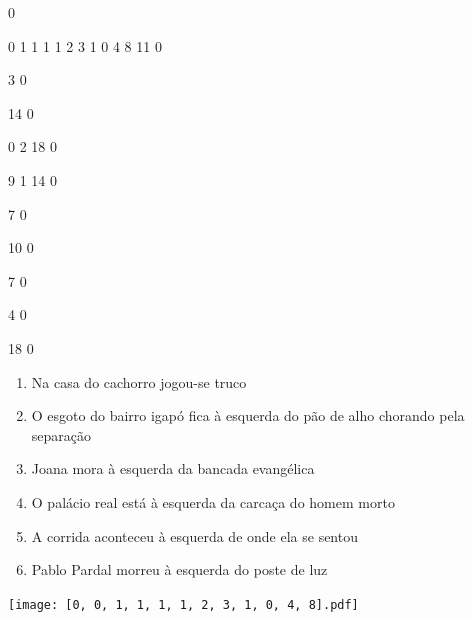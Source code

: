 \documentclass[12pt]{article}
\begin{document}
		\vfill  
		  
{
	0	%

	0	%
	1	%
	1	%
	1	%
	1	%
	2	%
	3	%
	1	%
	0	%
	4	%
	8	%
	11	%
	0	%

	3	%
	0	%

	14	%
	0	%

	0	%
	2	%
	18	%
	0	%

	9	%
	1	%
	14	%
	0	%

	7	%
	0	%

	10	%
	0	%

	7	%
	0	%

	4	%
	0	%

	18	%
	0	%

}	  
		    	

		 

\pagebreak


	\begin{enumerate}
		  \sffamily %
		  \large %


\vfill \item
Na casa do cachorro	%
jogou-se truco	%

\vfill \item
O esgoto do bairro igapó fica	%
à esquerda
do pão de alho chorando pela separação	%

\vfill \item
Joana mora	%
à esquerda
da bancada evangélica	%

\vfill \item
O palácio real está	%
à esquerda
da carcaça do homem morto	%

\vfill \item
A corrida aconteceu	%
à esquerda
de onde ela se sentou	%

\vfill \item
Pablo Pardal morreu	%
à esquerda
do poste de luz	%
	\end{enumerate}
		  
		  \hfill

		  \vfill

\texttt{[image: [0, 0, 1, 1, 1, 1, 2, 3, 1, 0, 4, 8].pdf]}


	\hfill	  	  

\end{document}
